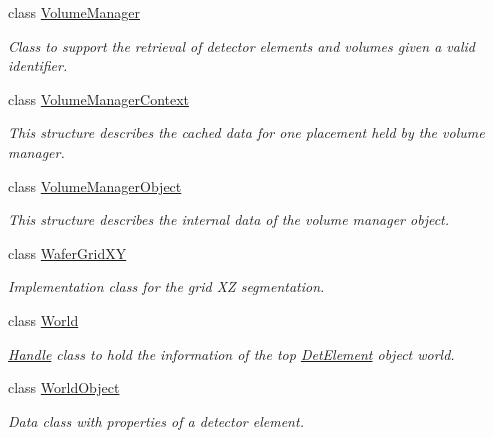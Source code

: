 \begin{DoxyCompactItemize}
class \hyperlink{class_d_d4hep_1_1_geometry_1_1_volume_manager}{Volume\+Manager}
\begin{DoxyCompactList}\small\item\em Class to support the retrieval of detector elements and volumes given a valid identifier. \end{DoxyCompactList}\item 
class \hyperlink{class_d_d4hep_1_1_geometry_1_1_volume_manager_context}{Volume\+Manager\+Context}
\begin{DoxyCompactList}\small\item\em This structure describes the cached data for one placement held by the volume manager. \end{DoxyCompactList}\item 
class \hyperlink{class_d_d4hep_1_1_geometry_1_1_volume_manager_object}{Volume\+Manager\+Object}
\begin{DoxyCompactList}\small\item\em This structure describes the internal data of the volume manager object. \end{DoxyCompactList}\item 
class \hyperlink{class_d_d4hep_1_1_geometry_1_1_wafer_grid_x_y}{Wafer\+Grid\+XY}
\begin{DoxyCompactList}\small\item\em Implementation class for the grid XZ segmentation. \end{DoxyCompactList}\item 
class \hyperlink{class_d_d4hep_1_1_geometry_1_1_world}{World}
\begin{DoxyCompactList}\small\item\em \hyperlink{class_d_d4hep_1_1_handle}{Handle} class to hold the information of the top \hyperlink{class_d_d4hep_1_1_geometry_1_1_det_element}{Det\+Element} object \textquotesingle{}world\textquotesingle{}. \end{DoxyCompactList}\item 
class \hyperlink{class_d_d4hep_1_1_geometry_1_1_world_object}{World\+Object}
\begin{DoxyCompactList}\small\item\em Data class with properties of a detector element. \end{DoxyCompactList}\end{DoxyCompactItemize}

